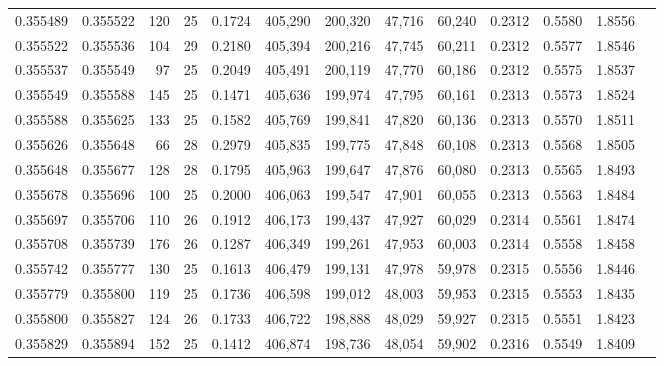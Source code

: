\begin{tabular}{rrrrrrrrrrrrr}
0.355489 & 0.355522 &   120 &  25 &                                     0.1724 & 405,290 & 200,320 &  47,716 &  60,240 & 0.2312 & 0.5580 & 1.8556 \\
0.355522 & 0.355536 &   104 &  29 &                                     0.2180 & 405,394 & 200,216 &  47,745 &  60,211 & 0.2312 & 0.5577 & 1.8546 \\
0.355537 & 0.355549 &    97 &  25 &                                     0.2049 & 405,491 & 200,119 &  47,770 &  60,186 & 0.2312 & 0.5575 & 1.8537 \\
0.355549 & 0.355588 &   145 &  25 &                                     0.1471 & 405,636 & 199,974 &  47,795 &  60,161 & 0.2313 & 0.5573 & 1.8524 \\
0.355588 & 0.355625 &   133 &  25 &                                     0.1582 & 405,769 & 199,841 &  47,820 &  60,136 & 0.2313 & 0.5570 & 1.8511 \\
0.355626 & 0.355648 &    66 &  28 &                                     0.2979 & 405,835 & 199,775 &  47,848 &  60,108 & 0.2313 & 0.5568 & 1.8505 \\
0.355648 & 0.355677 &   128 &  28 &                                     0.1795 & 405,963 & 199,647 &  47,876 &  60,080 & 0.2313 & 0.5565 & 1.8493 \\
0.355678 & 0.355696 &   100 &  25 &                                     0.2000 & 406,063 & 199,547 &  47,901 &  60,055 & 0.2313 & 0.5563 & 1.8484 \\
0.355697 & 0.355706 &   110 &  26 &                                     0.1912 & 406,173 & 199,437 &  47,927 &  60,029 & 0.2314 & 0.5561 & 1.8474 \\
0.355708 & 0.355739 &   176 &  26 &                                     0.1287 & 406,349 & 199,261 &  47,953 &  60,003 & 0.2314 & 0.5558 & 1.8458 \\
0.355742 & 0.355777 &   130 &  25 &                                     0.1613 & 406,479 & 199,131 &  47,978 &  59,978 & 0.2315 & 0.5556 & 1.8446 \\
0.355779 & 0.355800 &   119 &  25 &                                     0.1736 & 406,598 & 199,012 &  48,003 &  59,953 & 0.2315 & 0.5553 & 1.8435 \\
0.355800 & 0.355827 &   124 &  26 &                                     0.1733 & 406,722 & 198,888 &  48,029 &  59,927 & 0.2315 & 0.5551 & 1.8423 \\
0.355829 & 0.355894 &   152 &  25 &                                     0.1412 & 406,874 & 198,736 &  48,054 &  59,902 & 0.2316 & 0.5549 & 1.8409 \\

\end{tabular}
